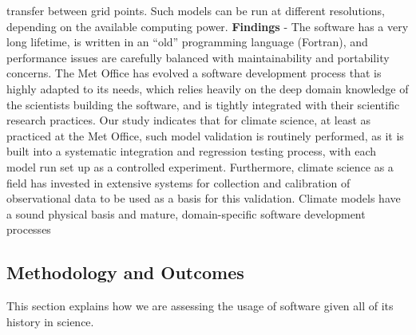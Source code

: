 transfer between grid points. Such models can be run at
different resolutions, depending on the available computing
power.
\textbf{Findings} - The software has a
very long lifetime, is written in an “old” programming language
(Fortran), and performance issues are carefully balanced
with maintainability and portability concerns. The Met Office has evolved a software development process
that is highly adapted to its needs, which relies heavily
on the deep domain knowledge of the scientists building the
software, and is tightly integrated with their scientific research
practices. Our study indicates that for climate science,
at least as practiced at the Met Office, such model validation
is routinely performed, as it is built into a systematic
integration and regression testing process, with each model
run set up as a controlled experiment. Furthermore, climate
science as a field has invested in extensive systems for
collection and calibration of observational data to be used
as a basis for this validation. Climate models have a sound
physical basis and mature, domain-specific software development
processes




\subsection*{Methodology and Outcomes}

This section explains how we are assessing the usage of software given all of its history in science.

